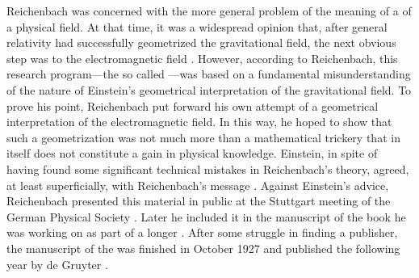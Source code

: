 \documentclass[submitted]{article}
\newcommand{\PRZL}{\citetitle{Reichenbach1928}\xspace}
\begin{document}
Reichenbach was concerned with the more general problem of the meaning of a  of a physical field. At that time, it was a widespread opinion that, after general relativity had successfully geometrized the gravitational field, the next obvious step was to  the electromagnetic field . However, according to Reichenbach, this research program---the so called \uftp {}---was based on a fundamental misunderstanding of the nature of Einstein's geometrical interpretation of the gravitational field. To prove his point, Reichenbach put forward his own attempt of a geometrical interpretation of the electromagnetic field. In this way, he hoped to show that such a geometrization was not much more than a mathematical trickery that in itself does not constitute a gain in physical knowledge. Einstein, in spite of having found some significant technical mistakes in Reichenbach's theory, agreed, at least superficially, with Reichenbach's  message \citep{Lehmkuhl2014}. Against Einstein's advice, Reichenbach presented this material in public at the Stuttgart meeting of the German Physical Society \citep{Reichenbach1926d}. Later he included it in the manuscript of the book he was working on as part of a longer \Ap. After some struggle in finding a publisher, the manuscript of the \PRZL was finished in October 1927 and published the following year by de Gruyter \citep[044-06-25]{HR}.
\end{document}
